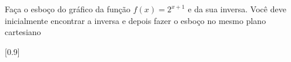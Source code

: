 \begin{exercises*}
\begin{exercise}
  Faça o esboço do gráfico da função $f(x)=2^{x+1}$ e da sua inversa. Você
  deve inicialmente encontrar a inversa e depois fazer o esboço no mesmo plano
  cartesiano

  \begin{answer}
    [0.9]
  \end{answer}
\end{exercise}

\end{exercises*}

